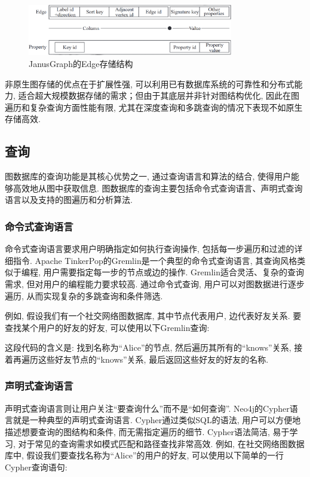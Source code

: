 \begin{figure}[H]
	\centering
	\includegraphics[width=0.8\textwidth]{images/13.png}
	\caption{JanusGraph的Edge存储结构}
	\label{fig:janusgraph-edge}
\end{figure}

非原生图存储的优点在于扩展性强, 可以利用已有数据库系统的可靠性和分布式能力, 适合超大规模数据存储的需求；但由于其底层并非针对图结构优化, 因此在图遍历和复杂查询方面性能有限, 尤其在深度查询和多跳查询的情况下表现不如原生存储高效.

\subsection{查询}

图数据库的查询功能是其核心优势之一, 通过查询语言和算法的结合, 使得用户能够高效地从图中获取信息. 图数据库的查询主要包括命令式查询语言、声明式查询语言以及支持的图遍历和分析算法.

\subsubsection*{命令式查询语言}

命令式查询语言要求用户明确指定如何执行查询操作, 包括每一步遍历和过滤的详细指令. Apache TinkerPop的Gremlin是一个典型的命令式查询语言, 其查询风格类似于编程, 用户需要指定每一步的节点或边的操作. Gremlin适合灵活、复杂的查询需求, 但对用户的编程能力要求较高. 通过命令式查询, 用户可以对图数据进行逐步遍历, 从而实现复杂的多跳查询和条件筛选.

例如, 假设我们有一个社交网络图数据库, 其中节点代表用户, 边代表好友关系. 要查找某个用户的好友的好友, 可以使用以下Gremlin查询:


这段代码的含义是: 找到名称为“Alice”的节点, 然后遍历其所有的“knows”关系, 接着再遍历这些好友节点的“knows”关系, 最后返回这些好友的好友的名称.

\subsubsection*{声明式查询语言}

声明式查询语言则让用户关注“要查询什么”而不是“如何查询”. Neo4j的Cypher语言就是一种典型的声明式查询语言. Cypher通过类似SQL的语法, 用户可以方便地描述想要查询的图结构和条件, 而无需指定遍历的细节. Cypher语法简洁, 易于学习, 对于常见的查询需求如模式匹配和路径查找非常高效. 例如, 在社交网络图数据库中, 假设我们要查找名称为“Alice”的用户的好友, 可以使用以下简单的一行Cypher查询语句:


